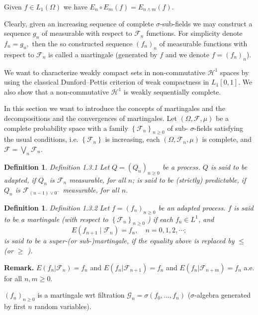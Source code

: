 \documentclass[reqno]{amsart}
\newtheorem{definition}[thm]{Definition}
\numberwithin{equation}{section}
\begin{document}
Given $f\in L_1(\Omega)$ we have $E_n \circ E_m (f)=E_{n \wedge m}(f).$

Clearly, given an increasing sequence of complete $\sigma$-sub-fields we may construct a sequence $g_n$ of measurable with respect to $\mathcal{F}_n$ functions. For simplicity denote $f_n=g_n,$ then the so constructed sequence $(f_n)_n$ of measurable functions with respect to $\mathcal{F}_n$ is called a martingale (generated by $f$ and we denote $f=(f_n)_n$).

We want to characterize weakly compact sets in non-commutative $\mathcal{H}^1$ spaces by using the classical Dunford--Pettis criterion of weak compactness in $L_1[0,1].$ We also show that a non-commutative $\mathcal{H}^1$ is weakly sequentially complete.

In this section we want to introduce the concepts of martingales and the decompositions and the convergences of martingales. Let $(\Omega, \mathcal{F}, \mu)$ be a complete probability space with a family $\left\{\mathcal{F}_n\right\}_{n \geq 0}$ of sub- $\sigma$-fields satisfying the usual conditions, i.e. $\left\{\mathcal{F}_n\right\}$ is increasing, each $\left(\Omega, \mathcal{F}_n, \mu\right)$ is complete, and $\mathcal{F}=\bigvee_n \mathcal{F}_n$.

\begin{definition}
Definition 1.3.1 Let $Q=\left(Q_n\right)_{n \geq 0}$ be a process. $Q$ is said to be adapted, if $Q_n$ is $\mathcal{F}_n$ measurable, for all $n$; is said to be (strictly) predictable, if $Q_n$ is $\mathcal{F}_{(n-1) \vee 0^{-}}$ measurable, for all $n$.
\end{definition}

\begin{definition}
Definition 1.3.2 Let $f=\left(f_n\right)_{n \geq 0}$ be an adapted process. $f$ is said to be a martingale (with respect to $\left\{\mathcal{F}_n\right\}_{n \geq 0}$ ) if each $f_n \in L^1$, and
$$
E\left(f_{n+1} \mid \mathcal{F}_n\right)=f_n, \quad n=0,1,2, \cdots ;
$$
is said to be a super-(or sub-)martingale, if the equality above is replaced by $\leq$ (or $\geq$ ).
\end{definition}


{\bf Remark.} $E(f_n|\mathcal{F}_n)=f_n$ and $E(f_n|\mathcal{F}_{n+1})=f_n$ and $E(f_n|\mathcal{F}_{n+m})=f_n$ a.e. for all $n,m \ge 0.$

$(f_n)_{n\ge 0}$ is a martingale wrt filtration $\mathcal{G}_n=\sigma(f_0,\ldots, f_n)$ ($\sigma$-algebra generated by first $n$ random variables).
\end{document}
